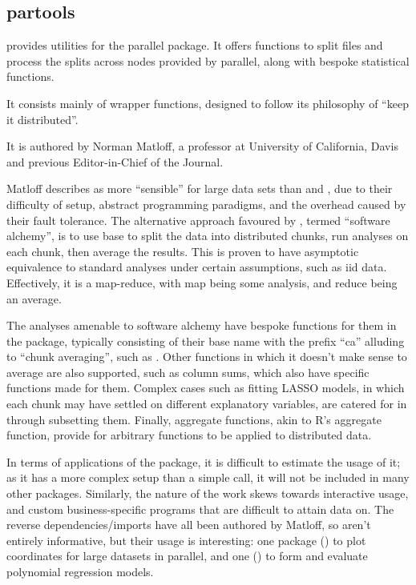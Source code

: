 \subsection{partools}\label{subsec:partools}

 provides utilities for the parallel
package\cite{matloff16softw_alchemy}.
It offers functions to split files and process the splits across nodes provided by parallel, along with bespoke statistical functions.

It consists mainly of wrapper functions, designed to follow its philosophy of ``keep it distributed''.

It is authored by Norman Matloff, a professor at University of California, Davis and previous Editor-in-Chief of the \R{} Journal.

Matloff describes  as more ``sensible'' for large data sets than  and , due to their difficulty of setup, abstract programming paradigms, and the overhead caused by their fault tolerance.
The alternative approach favoured by , termed ``software alchemy'', is to use base \R{} to split the data into distributed chunks, run analyses on each chunk, then average the results.
This is proven to have asymptotic equivalence to standard analyses under certain assumptions, such as iid data.
Effectively, it is a map-reduce, with map being some analysis, and reduce being an average.

The analyses amenable to software alchemy have bespoke functions for them in the package, typically consisting of their base \R{} name with the prefix ``ca'' alluding to ``chunk averaging'', such as .
Other functions in which it doesn't make sense to average are also supported, such as column sums, which also have specific functions made for them.
Complex cases such as fitting LASSO models, in which each chunk may have settled on different explanatory variables, are catered for in  through subsetting them.
Finally, aggregate functions, akin to R's aggregate function, provide for arbitrary functions to be applied to distributed data.

In terms of applications of the package, it is difficult to estimate the usage of it; as it has a more complex setup than a simple  call, it will not be included in many other packages.
Similarly, the nature of the work skews towards interactive usage, and custom business-specific programs that are difficult to attain data on.
The reverse dependencies/imports have all been authored by Matloff, so aren't entirely informative, but their usage is interesting: one package () to plot coordinates for large datasets in parallel, and one () to form and evaluate polynomial regression models.

